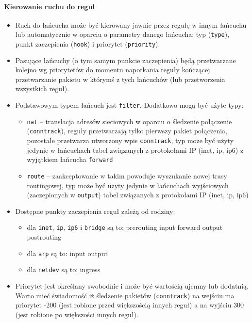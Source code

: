 \paragraph{Kierowanie ruchu do reguł}
\begin{itemize}
	\item Ruch do łańcucha może być kierowany jawnie przez regułę w innym łańcuchu lub automatycznie w oparciu o parametry danego łańcucha: typ (\Verb#type#), punkt zaczepienia (\Verb#hook#) i priorytet (\Verb#priority#).
	\item Pasujące łańcuchy (o tym samym punkcie zaczepienia) będą przetwarzane kolejno wg priorytetów do momentu napotkania reguły kończącej przetwarzanie pakietu w którymś z tych łańcuchów (lub przetworzenia wszystkich reguł).
	\item Podstawowym typem łańcuch jest \Verb#filter#. Dodatkowo mogą być użyte typy:
	\begin{itemize}
		\item \Verb#nat# –
			translacja adresów sieciowych w oparciu o śledzenie połączenie (\Verb#conntrack#),
			reguły przetwarzają tylko pierwszy pakiet połączenia, pozostałe przetwarza utworzony wpis \Verb#conntrack#,
			typ może być użyty jedynie w łańcuchach tabel związanych z protokołami IP (inet, ip, ip6) z wyjątkiem łańcucha \Verb#forward#
		\item \Verb#route# –
			zaakceptowanie w takim powoduje wyszukanie nowej trasy routingowej,
			typ może być użyty jedynie w łańcuchach wyjściowych (zaczepionych w \Verb#output#) tabel związanych z protokołami IP (inet, ip, ip6)
	\end{itemize}
	\item Dostępne punkty zaczepienia reguł zależą od rodziny:
	\begin{itemize}
		\item dla \Verb#inet#, \Verb#ip#, \Verb#ip6# i \Verb#bridge# są to:
			prerouting
			input
			forward
			output
			postrouting
		\item dla \Verb#arp# są to:
			input
			output
		\item dla \Verb#netdev# są to:
			ingress
	\end{itemize}
	\item Priorytet jest określany swobodnie i może być wartością ujemny lub dodatnią.
		Warto mieć świadomość iż śledzenie pakietów (\Verb#conntrack#) na wejściu ma priorytet -200 (jest robione przed większością innych reguł) a na wyjściu 300 (jest robione po większości innych reguł).
\end{itemize}

